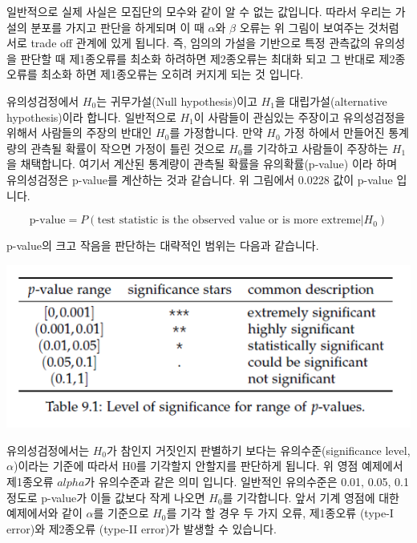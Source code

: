 \documentclass[
]{book}
\begin{document}
일반적으로 실제 사실은 모집단의 모수와 같이 알 수 없는 값입니다. 따라서 우리는 가설의 분포를 가지고 판단을 하게되며 이 때 \(\alpha\)와 \(\beta\) 오류는 위 그림이 보여주는 것처럼 서로 trade off 관계에 있게 됩니다. 즉, 임의의 가설을 기반으로 특정 관측값의 유의성을 판단할 때 제1종오류를 최소화 하려하면 제2종오류는 최대화 되고 그 반대로 제2종오류를 최소화 하면 제1종오류는 오히려 커지게 되는 것 입니다.

유의성검정에서 \(H_0\)는 귀무가설(Null hypothesis)이고 \(H_1\)을 대립가설(alternative hypothesis)이라 합니다. 일반적으로 \(H_1\)이 사람들이 관심있는 주장이고 유의성검정을 위해서 사람들의 주장의 반대인 \(H_0\)를 가정합니다. 만약 \(H_0\) 가정 하에서 만들어진 통계량의 관측될 확률이 작으면 가정이 틀린 것으로 \(H_0\)를 기각하고 사람들이 주장하는 \(H_1\)을 채택합니다. 여기서 계산된 통계량이 관측될 확률을 유의확률(p-value) 이라 하며 유의성검정은 p-value를 계산하는 것과 같습니다. 위 그림에서 0.0228 값이 p-value 입니다.

\[
\text{p-value} = P(\text{test statistic is the observed value or is more extreme}|H_0)
\]

p-value의 크고 작음을 판단하는 대략적인 범위는 다음과 같습니다.

\includegraphics[width=6.25in,height=\textheight]{./images/09/01.png}

유의성검정에서는 \(H_0\)가 참인지 거짓인지 판별하기 보다는 유의수준(significance level, \(\alpha\))이라는 기준에 따라서 H0를 기각할지 안할지를 판단하게 됩니다. 위 영점 예제에서 제1종오류 \(alpha\)가 유의수준과 같은 의미 입니다. 일반적인 유의수준은 0.01, 0.05, 0.1 정도로 p-value가 이들 값보다 작게 나오면 \(H_0\)를 기각합니다. 앞서 기계 영점에 대한 예제에서와 같이 \(\alpha\)를 기준으로 \(H_0\)를 기각 할 경우 두 가지 오류, 제1종오류 (type-I error)와 제2종오류 (type-II error)가 발생할 수 있습니다.
\end{document}

